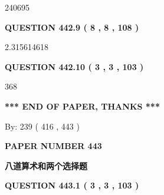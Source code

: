 \documentclass{ctexart}
\begin{document}
240695
 
 
  
\vspace{0.2in}
  
{\textbf{\Large{QUESTION
442.9 
 ( 8 , 8 , 108 )
}}}
  
  
 
 
\noindent{}

2.315614618
 
 
  
\vspace{0.2in}
  
{\textbf{\Large{QUESTION
442.10 
 ( 3 , 3 , 103 )
}}}
  
  
 
 
\noindent{}

368
 
 
   
   
 \vspace{0.2in}
 
   
   
   
   
\vspace{1.0in} 
{\textbf{\large{ *** END OF PAPER, THANKS *** }}} 
   
   
\hspace{1.0in} By: 
 239 ( 416 ,  443 )
   
   
   
   
\newpage 
\setcounter{page}{ 
   443001 } 
   
   
   
   
 {\textbf{ \Large{ PAPER NUMBER  443  }}}
   
   
\vspace{0.2in}
   
   
   
   
   
   
 \vspace{0.2in}
{\LARGE {\textbf{ 八道算术和两个选择题}}}
   
   
  
\vspace{0.2in}
  
{\textbf{\Large{QUESTION
443.1 
 ( 3 , 3 , 103 )
}}}
  
  
 
 
\noindent{}
\end{document}

